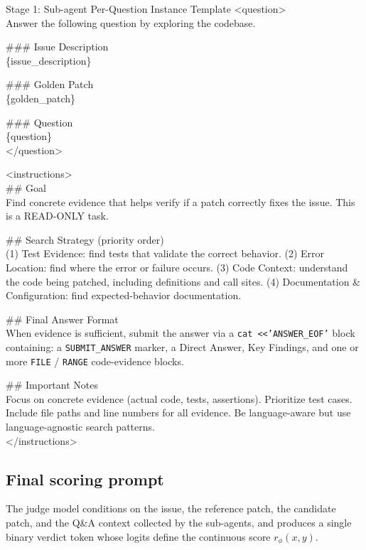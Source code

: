 \documentclass{llmxive}
\begin{document}
\begin{promptbox}{Stage 1: Sub-agent Per-Question Instance Template}
  \textless question\textgreater\\
  Answer the following question by exploring the codebase.

  \#\#\# Issue Description\\
  \{issue\_description\}

  \#\#\# Golden Patch\\
  \{golden\_patch\}

  \#\#\# Question\\
  \{question\}\\
  \textless /question\textgreater

  \textless instructions\textgreater\\
  \#\# Goal\\
  Find concrete evidence that helps verify if a patch correctly fixes the issue. This is a READ-ONLY task.

  \#\# Search Strategy (priority order)\\
  (1) Test Evidence: find tests that validate the correct behavior. (2) Error Location: find where the error or failure occurs. (3) Code Context: understand the code being patched, including definitions and call sites. (4) Documentation \& Configuration: find expected-behavior documentation.

  \#\# Final Answer Format\\
  When evidence is sufficient, submit the answer via a \texttt{cat \textless \textless 'ANSWER\_EOF'} block containing: a \texttt{SUBMIT\_ANSWER} marker, a Direct Answer, Key Findings, and one or more \texttt{FILE} / \texttt{RANGE} code-evidence blocks.

  \#\# Important Notes\\
  Focus on concrete evidence (actual code, tests, assertions). Prioritize test cases. Include file paths and line numbers for all evidence. Be language-aware but use language-agnostic search patterns.\\
  \textless /instructions\textgreater
\end{promptbox}

\subsection{Final scoring prompt}
\label{app:prompt-score}

The judge model conditions on the issue, the reference patch, the candidate patch, and the Q\&A context collected by the sub-agents, and produces a single binary verdict token whose logits define the continuous score $r_\phi(x, y)$.
\end{document}
